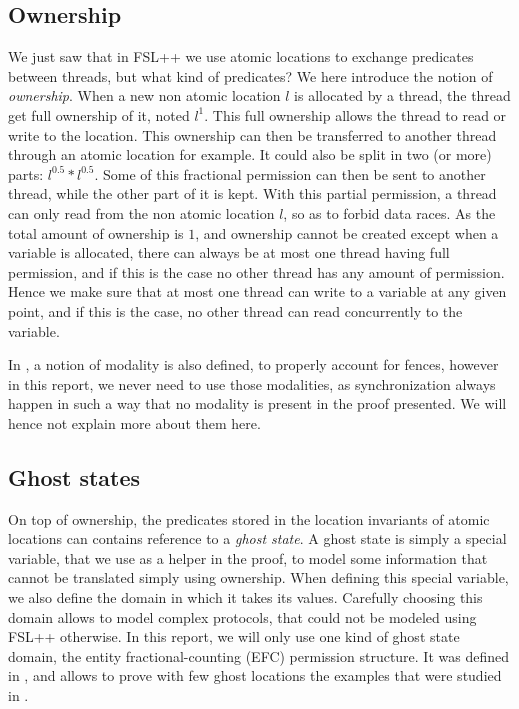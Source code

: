 \subsection{Ownership}
We just saw that in FSL++ we use atomic locations to exchange predicates between threads, but what kind of predicates? We here introduce the notion of \emph{ownership}. When a new non atomic location $l$ is allocated by a thread, the thread get full ownership of it, noted $l^1$. This full ownership allows the thread to read or write to the location. This ownership can then be transferred to another thread through an atomic location for example. It could also be split in two (or more) parts: $l^{0.5} * l^{0.5}$. Some of this fractional permission can then be sent to another thread, while the other part of it is kept. With this partial permission, a thread can only read from the non atomic location $l$, so as to forbid data races. As the total amount of ownership is $1$, and ownership cannot be created except when a variable is allocated, there can always be at most one thread having full permission, and if this is the case no other thread has any amount of permission. Hence we make sure that at most one thread can write to a variable at any given point, and if this is the case, no other thread can read concurrently to the variable. 

In \cite{fsl}, a notion of modality is also defined, to properly account for fences, however in this report, we never need to use those modalities, as synchronization always happen in such a way that no modality is present in the proof presented. We will hence not explain more about them here.

\subsection{Ghost states}
On top of ownership, the predicates stored in the location invariants of atomic locations can contains reference to a \emph{ghost state}. A ghost state is simply a special variable, that we use as a helper in the proof, to model some information that cannot be translated simply using ownership. When defining this special variable, we also define the domain in which it takes its values. Carefully choosing this domain allows to model complex protocols, that could not be modeled using FSL++ otherwise. In this report, we will only use one kind of ghost state domain, the entity  fractional-counting (EFC) permission structure. It was defined in \cite{gaurav}, and allows to prove with few ghost locations the examples that were studied in \cite{gaurav}.


